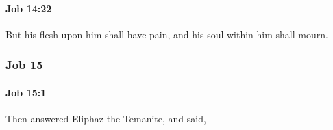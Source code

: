 		\paragraph{Job 14:22} %
			\label{JOB-14-22}

			But his flesh upon him shall have pain, and his soul within him shall mourn.

	\subsubsection{Job 15} %
		\label{JOB-15}

		\paragraph{Job 15:1} %
			\label{JOB-15-1}

			Then answered Eliphaz the Temanite, and said,


